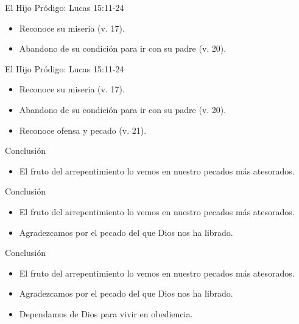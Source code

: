 \documentclass[17pt, aspectratio=169]{beamer}
\begin{document}
\begin{frame}{El Hijo Pr\'odigo: Lucas 15:11-24}
    \begin{itemize}
        \item Reconoce su miseria (v. 17).
        \item Abandono de su condici\'on para ir con su padre (v. 20).
        
    \end{itemize}
\end{frame}

\begin{frame}{El Hijo Pr\'odigo: Lucas 15:11-24}
    \begin{itemize}
        \item Reconoce su miseria (v. 17).
        \item Abandono de su condici\'on para ir con su padre (v. 20).
        \item Reconoce ofensa y pecado (v. 21).

    \end{itemize}
\end{frame}

\begin{frame}{Conclusi\'on}
    \begin{itemize}
        \item El fruto del arrepentimiento lo vemos en nuestro pecados m\'as atesorados.
    \end{itemize}
\end{frame}

\begin{frame}{Conclusi\'on}
    \begin{itemize}
        \item El fruto del arrepentimiento lo vemos en nuestro pecados m\'as atesorados.
        \item Agradezcamos por el pecado del que Dios nos ha librado.
    \end{itemize}
\end{frame}

\begin{frame}{Conclusi\'on}
    \begin{itemize}
        \item El fruto del arrepentimiento lo vemos en nuestro pecados m\'as atesorados.
        \item Agradezcamos por el pecado del que Dios nos ha librado.
        \item Dependamos de Dios para vivir en obediencia.
    \end{itemize}
\end{frame}
\end{document}
